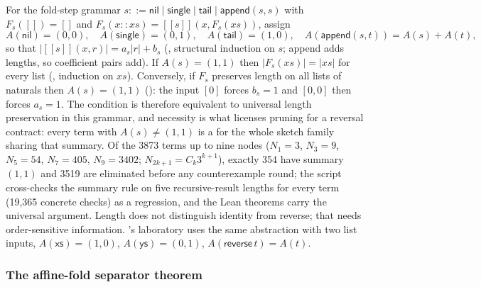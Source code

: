 For the fold-step grammar $s::=\mathsf{nil}\mid\mathsf{single}\mid\mathsf{tail}\mid\mathsf{append}(s,s)$ with $F_s([])=[]$ and $F_s(x::xs)=[\![s]\!](x,F_s(xs))$, assign
\[
 A(\mathsf{nil})=(0,0),\quad A(\mathsf{single})=(0,1),\quad A(\mathsf{tail})=(1,0),\quad A(\mathsf{append}(s,t))=A(s)+A(t),
\]
so that $|[\![s]\!](x,r)|=a_s|r|+b_s$ (, structural induction on $s$; append adds lengths, so coefficient pairs add). If $A(s)=(1,1)$ then $|F_s(xs)|=|xs|$ for every list (, induction on $xs$). Conversely, if $F_s$ preserves length on all lists of naturals then $A(s)=(1,1)$ (): the input $[0]$ forces $b_s=1$ and $[0,0]$ then forces $a_s=1$. The condition is therefore equivalent to universal length preservation in this grammar, and necessity is what licenses pruning for a reversal contract: every term with $A(s)\neq(1,1)$ is a  for the whole sketch family sharing that summary. Of the 3873 terms up to nine nodes ($N_1=3$, $N_3=9$, $N_5=54$, $N_7=405$, $N_9=3402$; $N_{2k+1}=C_k3^{k+1}$), exactly 354 have summary $(1,1)$ and 3519 are eliminated before any counterexample round; the script cross-checks the summary rule on five recursive-result lengths for every term (19{,}365 concrete checks) as a regression, and the Lean theorems carry the universal argument. Length does not distinguish identity from reverse; that needs order-sensitive information. 's laboratory uses the same abstraction with two list inputs, $A(\mathsf{xs})=(1,0)$, $A(\mathsf{ys})=(0,1)$, $A(\mathsf{reverse}\,t)=A(t)$.

\subsubsection{The affine-fold separator theorem}

